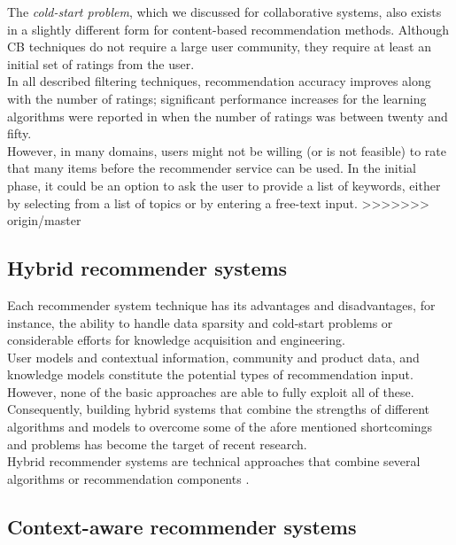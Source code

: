 The \textit{cold-start problem}, which we discussed for collaborative
systems, also exists in a slightly different form for content-based
recommendation methods. Although CB techniques do not
require a large user community, they require at least an initial set
of ratings from the user. \\In all described filtering techniques,
recommendation accuracy improves along with the number of ratings;
significant performance increases for the learning algorithms were
reported in \cite{pazzani1997learning}  when the number of ratings was
between twenty and fifty. \\ However, in many domains, users might not be
willing (or is not feasible) to rate that many items before the recommender 
service can be used. In the initial phase, it could be an option to ask 
the user to provide a list of keywords, either by selecting from a 
list of topics or by entering a free-text input.
>>>>>>> origin/master

\subsection{Hybrid recommender systems} 

Each recommender system technique has its advantages and disadvantages, 
for instance, the ability to handle data sparsity and cold-start problems
or considerable efforts for knowledge acquisition and engineering. \\
User models and contextual information, community and product data,
and knowledge models constitute the potential types of recommendation
input. However, none of the basic approaches are able to fully exploit
all of these. \\Consequently, building hybrid systems that combine the
strengths of different algorithms and models to overcome some of the
afore mentioned shortcomings and problems has become the target of
recent research. \\Hybrid recommender systems are technical approaches
that combine several algorithms or recommendation 
components  \cite{jannach2010recommender}.

\subsection{Context-aware recommender systems}

